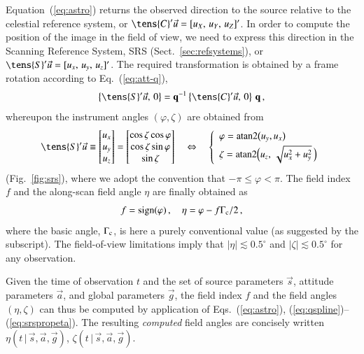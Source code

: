 \documentclass[structabstract]{aa}
\newcommand{\quat}[1]{\mathbf{#1}}
\begin{document}
Equation~(\ref{eq:astro}) returns the observed direction to the source
relative to the celestial reference system, or 
$\tens{C}'\vec{u}=[u_X,\,u_Y,\,u_Z]'$. In order 
to compute the position of the image in the field of view,   
we need to express this direction in the Scanning Reference System,
SRS (Sect.~\ref{sec:refsystems}), or $\tens{S}'\vec{u}=[u_x,\,u_y,\,u_z]'$. 
The required transformation is obtained by a frame rotation according 
to Eq.~(\ref{eq:att-q}),
\begin{equation}\label{eq:srsprop}
\left\{\tens{S}'\vec{u},\,0\right\}
=\quat{q}^{-1}\left\{\tens{C}'\vec{u},\,0\right\}\,\quat{q} \, ,
\end{equation}
whereupon the instrument angles $(\varphi,\zeta)$ are obtained from
\begin{equation}\label{eq:srsprop1}
   \tens{S}'\vec{u}
\equiv
    \begin{bmatrix}
        u_x \\  u_y \\   u_z
    \end{bmatrix}
=
    \begin{bmatrix}
        \cos\zeta\cos\varphi \\
        \cos\zeta\sin\varphi \\
        \sin\zeta
    \end{bmatrix}
\quad\Leftrightarrow\quad
\left\{\begin{array}{l} \varphi = \text{atan2}\bigl(u_y,u_x\bigr)\\[3pt]
\zeta = \text{atan2}\Bigl(u_z,\,\sqrt{u_x^2+u_y^2}\,\Bigr) \end{array}\right.
\end{equation}
(Fig.~\ref{fig:srs}), where we adopt the convention that $-\pi \le \varphi < \pi$.
The field index $f$ and the along-scan field angle $\eta$ are
finally obtained as
\begin{equation}\label{eq:srspropeta}
f = \text{sign}(\varphi)\, , \quad \eta = \varphi - f\Gamma_{\rm c}/2 \, ,
\end{equation}
where the basic angle, $\Gamma_{\rm c}$, is here a purely conventional value
(as suggested by the subscript).
The field-of-view limitations imply that
$|\eta| \lesssim 0.5^\circ$ and $|\zeta| \lesssim 0.5^\circ$
for any observation.

Given the time of observation $t$ and the set of source
parameters $\vec{s}$, attitude parameters $\vec{a}$, and global
parameters $\vec{g}$, the field index $f$ and the field angles
$(\eta,\zeta)$ can thus be computed by application of
Eqs.~(\ref{eq:astro}), (\ref{eq:qspline})--(\ref{eq:srspropeta}).
The resulting \emph{computed} field angles
are concisely written $\eta(t\,|\,\vec{s},\vec{a},\vec{g})$,
$\zeta(t\,|\,\vec{s},\vec{a},\vec{g})$.
\end{document}
